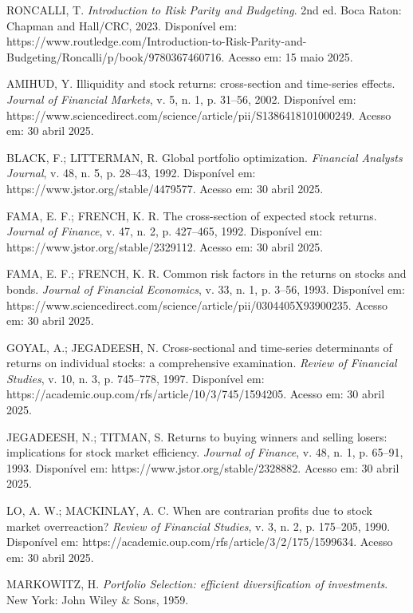 \begin{thebibliography}{99}
RONCALLI, T. \textit{Introduction to Risk Parity and Budgeting}. 2nd ed. Boca Raton: Chapman and Hall/CRC, 2023. Disponível em: https://www.routledge.com/Introduction-to-Risk-Parity-and-Budgeting/Roncalli/p/book/9780367460716. Acesso em: 15 maio 2025.

AMIHUD, Y. Illiquidity and stock returns: cross-section and time-series effects. \textit{Journal of Financial Markets}, v. 5, n. 1, p. 31--56, 2002. Disponível em: https://www.sciencedirect.com/science/article/pii/S1386418101000249. Acesso em: 30 abril 2025.

BLACK, F.; LITTERMAN, R. Global portfolio optimization. \textit{Financial Analysts Journal}, v. 48, n. 5, p. 28--43, 1992. Disponível em: https://www.jstor.org/stable/4479577. Acesso em: 30 abril 2025.

FAMA, E. F.; FRENCH, K. R. The cross-section of expected stock returns. \textit{Journal of Finance}, v. 47, n. 2, p. 427--465, 1992. Disponível em: https://www.jstor.org/stable/2329112. Acesso em: 30 abril 2025.

FAMA, E. F.; FRENCH, K. R. Common risk factors in the returns on stocks and bonds. \textit{Journal of Financial Economics}, v. 33, n. 1, p. 3--56, 1993. Disponível em: https://www.sciencedirect.com/science/article/pii/0304405X93900235. Acesso em: 30 abril 2025.

GOYAL, A.; JEGADEESH, N. Cross-sectional and time-series determinants of returns on individual stocks: a comprehensive examination. \textit{Review of Financial Studies}, v. 10, n. 3, p. 745--778, 1997. Disponível em: https://academic.oup.com/rfs/article/10/3/745/1594205. Acesso em: 30 abril 2025.

JEGADEESH, N.; TITMAN, S. Returns to buying winners and selling losers: implications for stock market efficiency. \textit{Journal of Finance}, v. 48, n. 1, p. 65--91, 1993. Disponível em: https://www.jstor.org/stable/2328882. Acesso em: 30 abril 2025.

LO, A. W.; MACKINLAY, A. C. When are contrarian profits due to stock market overreaction? \textit{Review of Financial Studies}, v. 3, n. 2, p. 175--205, 1990. Disponível em: https://academic.oup.com/rfs/article/3/2/175/1599634. Acesso em: 30 abril 2025.

MARKOWITZ, H. \textit{Portfolio Selection: efficient diversification of investments}. New York: John Wiley \& Sons, 1959.


\end{thebibliography}
